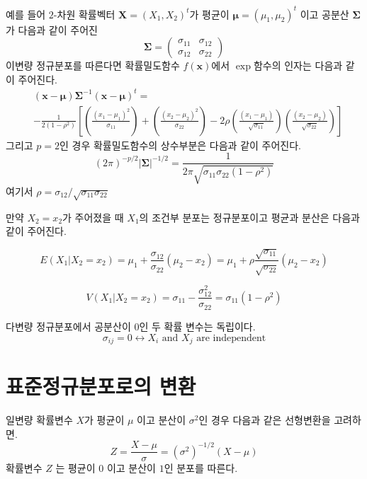 \documentclass[
]{book}
\theoremstyle{definition}
\theoremstyle{definition}
\theoremstyle{definition}
\theoremstyle{remark}
\begin{document}
예를 들어 \(2\)-차원 확률벡터 \(\bm X=(X_1, X_2)^t\)가 평균이 \(\bm \mu=(\mu_1,\mu_2)^t\) 이고
공분산 \(\bm \Sigma\)가 다음과 같이 주어진
\begin{equation*}
\bm \Sigma =
  \begin{pmatrix}
\sigma_{11} & \sigma_{12} \\
\sigma_{12} & \sigma_{22}
\end{pmatrix}
\end{equation*}
이변량 정규분포를 따른다면 확률밀도함수 \(f(\bm x)\)에서 \(\exp\)함수의 인자는 다음과 같이 주어진다.
\begin{eqnarray*}
&(\bm x-\bm \mu) \bm \Sigma^{-1}(\bm x-\bm \mu)^t
= \\
&-\frac{1}{2 (1-\rho^2)} 
\left [ 
  \left ( \frac{(x_1-\mu_1)^2}{\sigma_{11}} \right )
  +\left ( \frac{(x_2-\mu_2)^2}{\sigma_{22}} \right )
  -2 \rho \left ( \frac{(x_1-\mu_1)}{\sqrt{\sigma_{11}}} \right )
  \left ( \frac{(x_2-\mu_2)}{\sqrt{\sigma_{22}}} \right )
  \right ]
\end{eqnarray*}
그리고 \(p=2\)인 경우 확률밀도함수의 상수부분은 다음과 같이 주어진다.
\[ (2 \pi)^{-p/2} | \bm \Sigma|^{-1/2} = \frac{1}{ 2 \pi \sqrt{\sigma_{11} \sigma_{22} (1-\rho^2)}} \]
여기서 \(\rho = \sigma_{12} / \sqrt{\sigma_{11} \sigma_{22}}\)

만약 \(X_2 = x_2\)가 주어졌을 때 \(X_1\)의 조건부 분포는 정규분포이고 평균과 분산은 다음과 같이 주어진다.

\[ 
  E( X_1 |  X_2 =  x_2 ) =  \mu_1 +  \frac{\sigma_{12}}{\sigma_{22}} ( \mu_2 -  x_2)  = \mu_1 +  \rho \frac{\sqrt{\sigma_{11}}}{\sqrt{\sigma_{22}}} ( \mu_2 -  x_2) \]

\[
  V( X_1 |  X_2 =  x_2 )  =  \sigma_{11} - \frac{\sigma^2_{12}}{\sigma_{22}}  = \sigma_{11}(1-\rho^2)
  \]

다변량 정규분포에서 공분산이 0인 두 확률 변수는 독립이다.
\[ \sigma_{ij} = 0 \leftrightarrow X_i \text{ and } X_j \text{ are independent} \]

\hypertarget{uxd45cuxc900uxc815uxaddcuxbd84uxd3ecuxb85cuxc758-uxbcc0uxd658}{%
\section{표준정규분포로의 변환}\label{uxd45cuxc900uxc815uxaddcuxbd84uxd3ecuxb85cuxc758-uxbcc0uxd658}}

일변량 확률변수 \(X\)가 평균이 \(\mu\) 이고 분산이 \(\sigma^2\)인 경우 다음과 같은 선형변환을 고려하면.
\[ Z = \frac{X - \mu}{\sigma} = (\sigma^2)^{-1/2} (X-\mu) \]
확률변수 \(Z\) 는 평균이 \(0\) 이고 분산이 \(1\)인 분포를 따른다.
\end{document}
